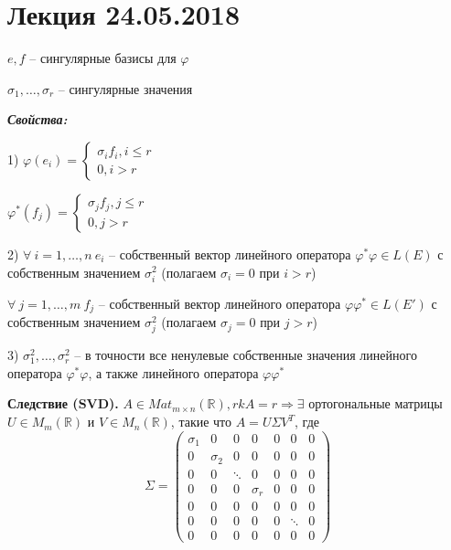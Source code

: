 \section{Лекция 24.05.2018}

$e, f$ -- сингулярные базисы для $\varphi$

$\sigma_1, \dots, \sigma_r$ -- сингулярные значения

\vspace{\baselineskip}
\textbf{\textit{Свойства:}}

1) $\varphi(e_i) = \begin{cases} \sigma_i f_i, i \leqslant r \\ 0, i > r \end{cases}$

$\varphi^*(f_j) = \begin{cases} \sigma_j f_j, j \leqslant r \\ 0, j > r \end{cases}$

\vspace{\baselineskip}
2) $\forall \ i = 1, \dots, n \ e_i$ -- собственный вектор линейного оператора $\varphi^* \varphi \in L(E)$ с собственным значением $\sigma_i^2$ (полагаем $\sigma_i = 0$ при $i > r$) 

$\forall \ j = 1, \dots, m \ f_j$ -- собственный вектор линейного оператора $\varphi \varphi^* \in L(E')$ с собственным значением $\sigma_j^2$ (полагаем $\sigma_j = 0$ при $j > r$) 

\vspace{\baselineskip}
3) $\sigma_1^2, \dots, \sigma_r^2$ -- в точности все ненулевые собственные значения линейного оператора $\varphi^* \varphi$, а также линейного оператора $\varphi \varphi^*$

\vspace{\baselineskip}
\textbf{Следствие (SVD).} $A \in Mat_{m \times n} (\mathbb{R}), rkA = r \Rightarrow \exists$ ортогональные матрицы $U \in M_m(\mathbb{R})$ и $V \in M_n(\mathbb{R})$, такие что $A = U \Sigma V^T$, где \[\Sigma = \begin{pmatrix} \sigma_1 & 0 & 0 & 0 & 0 & 0 & 0 \\  0 & \sigma_2 & 0 & 0 & 0 & 0 & 0 \\ 0 & 0 & \ddots & 0 & 0 & 0 & 0 \\ 0 & 0 & 0 & \sigma_r & 0 & 0 & 0 \\ 0 & 0 & 0 & 0 & 0 & 0 & 0 \\ 0 & 0 & 0 & 0 & 0 & \ddots & 0 \\ 0 & 0 & 0 & 0 & 0 & 0 & 0 \end{pmatrix}\]

